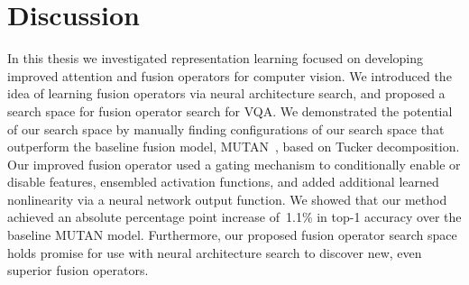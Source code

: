 \chapter{Discussion}

In this thesis we investigated representation learning focused on developing
improved attention and fusion operators for computer vision.
We introduced the idea of learning fusion operators via neural architecture
search, and proposed a search space for fusion operator search for VQA\@.
We demonstrated the potential of our search space by manually finding
configurations of our search space that outperform the baseline fusion model,
MUTAN~\cite{ben2017mutan}, based on Tucker decomposition.
Our improved fusion operator used a gating mechanism to conditionally enable or
disable features, ensembled activation functions, and added additional learned
nonlinearity via a neural network output function.
We showed that our method achieved an absolute percentage point increase
of~\num{1.1}\% in top-1 accuracy over the baseline MUTAN model.
Furthermore, our proposed fusion operator search space holds promise for use
with neural architecture search to discover new, even superior fusion
operators.
